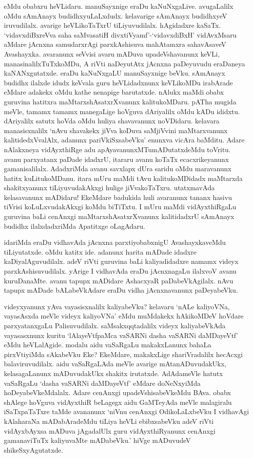 eMdu obabxru heVLidaru. manuSayxnige eraDu kaNuNxgaLive. avugaLalilx oMdu sAmAnayx budidhxyuLaLxdudx. kelavarige sAmAnayx budidhxyeV 
iruvudilalx. avarige heVLikoTaTxrU tiLiyuvudilalx. hAgidadxre kaSaTx. `vidavxdiBxreVva saha saMvasatiH divxtiVyamf'-`vidavxdiBxH' vidAvxMsaru aMdare jAcnxna 
samudarxrAgi parxkAshisuva mahAtamxra sahavAsaveV Avashayxka. avaranunx seVvisi avaru mADuva upadeVshavanunx keVLi, manasinalilxTuTxkoMDu, A 
riVti naDeyutAtx jAcnxna paDeyuvudu eraDaneya kaNANxgutatxde. eraDu kaNuNxgaLU manuSayxnige beVku. sAmAnayx budidhx ilalxde 
idudx keVvala guru heVLidadxnunx keVLikoMDu irabArade eMdare adakekx oMdu kathe nenapige barutatxde. nAlukx maMdi obabx guruvina 
hatitxra maMtarxshAsatxrXvanunx kalitukoMDaru. pATha mugida meVle, tamamx tamamx manegaLige hoVguva dAriyalilx oMdu kADu 
ididxtu. dAriyalilx satutx hoVda oMdu huliya shavavanunx noVDidaru. kelavara manasisxnalilx `nAvu shavakekx jiVva koDuva saMjiVvini 
maMtarxvanunx kalitidedxVvalAlx, adanunx pariVkiSxsabeVku' enunxva vicAra baMditu. Adare nAlakxneya vidAyxthiRge adu 
apAyavanunxMTumADutatxdeMdu toVritu. avanu parxyatanx paDade idadxrU, itararu avanu koTaTx ecacxrikeyanunx gamanisalilalx. AdadxriMda avanu savxlapx dUra saridu oMdu maravanunx hatitx kuLitukoMDanu. itara mUru maMdi tAvu kalitukoMDidadx maMtarxda shakitxyanunx tiLiyuvudakAkxgi hulige jiVvakoTaTxru. utatxmavAda kelasavanunx mADidaru! EkeMdare badukida huli avaranunx tananx hasivu tiVrisi koLuLxvudakAkxgi koMdu biTiTxtu. I mUru maMdi vidAyxthiRgaLu guruvina baLi cenAnxgi maMtarxshAsatxrXvanunx kalitidadxrU sAmAnayx budidhx ilalxdadxriMda Apatitxge oLagAdaru. 

idariMda eraDu vidhavAda jAcnxna parxtiyobabxnigU AvashayxkaveMdu tiLiyutatxde. oMdu katitx ide. adanunx harita mADade idadxre 
kaDiyalAguvudilalx. adeV riVti guruvina baLi kaliyadidadxre namamx videyx parxkAshisuvudilalx. yArige I vidhavAda eraDu jAcnxnagaLu 
ilalxvoV avanu kuruDanaMte. avanu tapupx mADidare AshacxyaR paDabeVkAgilalx. nAvu tapupx mADade bALabeVkAdare eraDu vidha jAcnxnavanunx paDeyabeVku.

videyxyanunx yAva vayasisxnalilx kaliyabeVku? kelavaru `nALe kaliyoVNa, vayasAsxda meVle videyx kaliyoVNa' eMdu muMdakekx 
hAkikoMDeV hoVdare parxyatanxgaLu Palisuvudilalx. saMsakxqqtadalilx videyx kaliyabeVkAda vayasasxnunx kuritu `lAlayeVtfpaMca 
vaSARNi dasha vaSARNi daMDayeVtf' eMdu heVLalAgide. modalu aidu vaSaRgaLu makakxLanunx bahaLa pirxVtiyiMda sAkabeVku Eke? EkeMdare, 
makakxLige shariVradalilx hecAcxgi balaviruvudilalx. aidu vaSaRgaLAda meVle avarige mAtanADuvudakUkx, kelasagaLanunx mADuvudakUkx 
shakitx irutatxde. AdAdameVle hatutx vaSaRgaLu `dasha vaSARNi daMDayeVtf' eMdare doNeNxyiMda hoDeyabeVkeMdalalx. Adare 
cenAnxgi upadeVshisabeVkeMdu BAva. obabx shAlege hoVguva vidAyxthiR beLagegx aidu GaMTeyAda meVle malagiralu iSaTxpaTaTxre taMde avananunx 
`niVnu cenAnxgi OdikoLaLxbeVku I vidhavAgi kAlaharaNa mADabAradeMdu tiLiya heVLi ebibxsabeVku adeV riVti vidAyxbAyxsa mADuva jAgadalUlx guru 
vidAyxthiRyanunx cenAnxgi gamanaviTuTx kaliyuvaMte mADabeVku.' hiVge mADuvudeV shikeSxyAgutatxde. 

